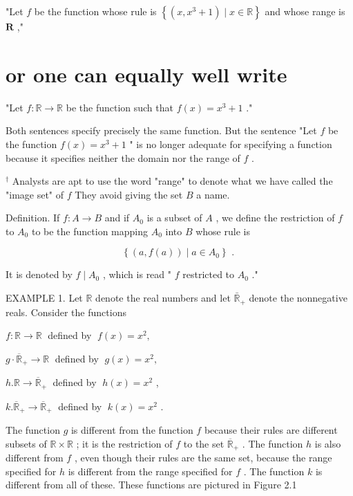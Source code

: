 "Let \(f\) be the function whose rule is \(\left\{  {\left( {x,{x}^{3} + 1}\right)  \mid  x \in  \mathbb{R}}\right\}\) and whose range is \(\mathbf{R}\) ,"

\section*{or one can equally well write}

"Let \(f : \mathbb{R} \rightarrow  \mathbb{R}\) be the function such that \(f\left( x\right)  = {x}^{3} + 1\) ."

Both sentences specify precisely the same function. But the sentence "Let \(f\) be the function \(f\left( x\right)  = {x}^{3} + 1\) " is no longer adequate for specifying a function because it specifies neither the domain nor the range of \(f\) .

\({}^{ \dagger  }\) Analysts are apt to use the word "range" to denote what we have called the "image set" of \(f\) They avoid giving the set \(B\) a name.


Definition. If \(f : A \rightarrow  B\) and if \({A}_{0}\) is a subset of \(A\) , we define the restriction of \(f\) to \({A}_{0}\) to be the function mapping \({A}_{0}\) into \(B\) whose rule is

\[
\left\{  {\left( {a,f\left( a\right) }\right)  \mid  a \in  {A}_{0}}\right\}  \text{ . }
\]

It is denoted by \(f \mid  {A}_{0}\) , which is read " \(f\) restricted to \({A}_{0}\) ."

EXAMPLE 1. Let \(\mathbb{R}\) denote the real numbers and let \({\bar{\mathbb{R}}}_{ + }\) denote the nonnegative reals. Consider the functions

\(f : \mathbb{R} \rightarrow  \mathbb{R}\;\) defined by \(\;f\left( x\right)  = {x}^{2},\)

\(g \cdot  {\overline{\mathbb{R}}}_{ + } \rightarrow  \mathbb{R}\;\) defined by \(\;g\left( x\right)  = {x}^{2},\)

\(h.\mathbb{R} \rightarrow  {\overline{\mathbb{R}}}_{ + }\;\) defined by \(\;h\left( x\right)  = {x}^{2}\) ,

\(k.{\overline{\mathbb{R}}}_{ + } \rightarrow  {\overline{\mathbb{R}}}_{ + }\;\) defined by \(\;k\left( x\right)  = {x}^{2}\) .

The function \(g\) is different from the function \(f\) because their rules are different subsets of \(\mathbb{R} \times  \mathbb{R}\) ; it is the restriction of \(f\) to the set \({\overline{\mathbb{R}}}_{ + }\) . The function \(h\) is also different from \(f\) , even though their rules are the same set, because the range specified for \(h\) is different from the range specified for \(f\) . The function \(k\) is different from all of these. These functions are pictured in Figure 2.1

